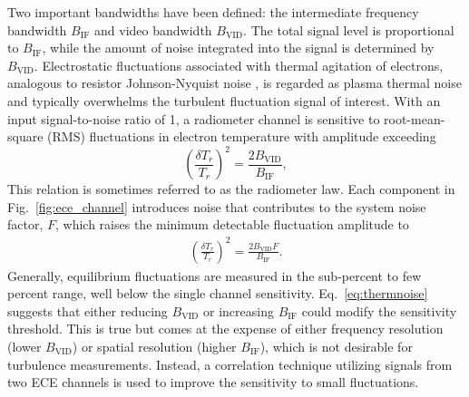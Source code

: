 \documentclass[%
 aip,
 amsmath,amssymb,
 reprint,%
]{revtex4-1}
\begin{document}


Two important bandwidths have been defined: the intermediate frequency bandwidth $B_\mathrm{IF}$ and video bandwidth $B_\mathrm{VID}$. The total signal level is proportional to $B_\mathrm{IF}$, while the amount of noise integrated into the signal is determined by $B_\mathrm{VID}$. Electrostatic fluctuations associated with thermal agitation of electrons, analogous to resistor Johnson-Nyquist noise \cite{johnson1927thermal,nyquist1928thermal}, is regarded as plasma thermal noise and typically overwhelms the turbulent fluctuation signal of interest. With an input signal-to-noise ratio of 1, a radiometer channel is sensitive to root-mean-square (RMS) fluctuations in electron temperature with amplitude exceeding
\begin{equation}
	\left( \frac{\delta T_r}{T_r} \right)^2 = \frac{2B_\mathrm{VID}}{B_\mathrm{IF}}, \label{eq:thermnoise}
\end{equation}
This relation is sometimes referred to as the radiometer law. Each component in Fig.\ \ref{fig:ece_channel} introduces noise that contributes to the system noise factor, $F$, which raises the minimum detectable fluctuation amplitude to \cite{dicke1946measurement}
\begin{align}
	\left( \frac{\delta T_r}{T_r} \right)^2 = \frac{2 B_\mathrm{VID} F}{B_\mathrm{IF}}. \label{eq:thermnoise-nf}
\end{align}
Generally, equilibrium fluctuations are measured in the sub-percent to few percent range, well below the single channel sensitivity. Eq.\ \eqref{eq:thermnoise} suggests that either reducing $B_\mathrm{VID}$ or increasing $B_\mathrm{IF}$ could modify the sensitivity threshold. This is true but comes at the expense of either frequency resolution (lower $B_\mathrm{VID}$) or spatial resolution (higher $B_\mathrm{IF}$), which is not desirable for turbulence measurements. Instead, a correlation technique utilizing signals from two ECE channels is used to improve the sensitivity to small fluctuations.

\end{document}

